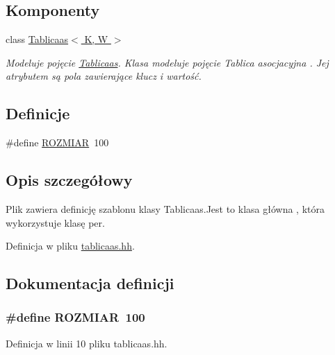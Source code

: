 \subsection*{Komponenty}
\begin{DoxyCompactItemize}
\item 
class \hyperlink{class_tablicaas}{Tablicaas$<$ K, W $>$}
\begin{DoxyCompactList}\small\item\em Modeluje pojęcie \hyperlink{class_tablicaas}{Tablicaas}. Klasa modeluje pojęcie Tablica asocjacyjna . Jej atrybutem są pola zawierające klucz i wartość. \end{DoxyCompactList}\end{DoxyCompactItemize}
\subsection*{Definicje}
\begin{DoxyCompactItemize}
\item 
\#define \hyperlink{tablicaas_8hh_aa50aa866c5823769bb02e986d29a0589}{R\-O\-Z\-M\-I\-A\-R}~100
\end{DoxyCompactItemize}


\subsection{Opis szczegółowy}
Plik zawiera definicję szablonu klasy Tablicaas.\-Jest to klasa główna , która wykorzystuje klasę per. 

Definicja w pliku \hyperlink{tablicaas_8hh_source}{tablicaas.\-hh}.



\subsection{Dokumentacja definicji}
\hypertarget{tablicaas_8hh_aa50aa866c5823769bb02e986d29a0589}{
\subsubsection[{R\-O\-Z\-M\-I\-A\-R}]{\setlength{\rightskip}{0pt plus 5cm}\#define R\-O\-Z\-M\-I\-A\-R~100}}\label{tablicaas_8hh_aa50aa866c5823769bb02e986d29a0589}


Definicja w linii 10 pliku tablicaas.\-hh.

